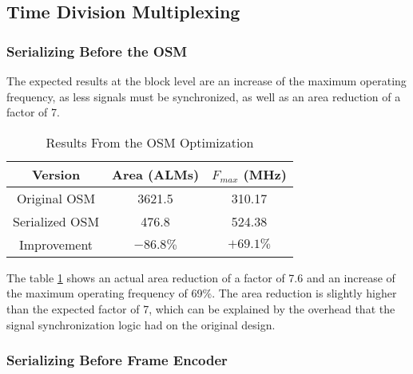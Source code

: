 
\subsection{Time Division Multiplexing}


\subsubsection{Serializing Before the OSM}

The expected results at the block level are an increase of the maximum operating frequency, as less signals must be synchronized, as well as an area reduction of a factor of 7.

\begin{table}[ht]
    \centering
    \begin{tabular}{|c|c|c|}
        \hline
        Version & Area (ALMs) & \(F_{max}\) (MHz) \\
        \hline
        Original OSM & 3621.5 & 310.17 \\
        Serialized OSM & 476.8 & 524.38  \\
        \hline
        Improvement & \(-86.8\%\) & \(+69.1\%\) \\
        \hline
    \end{tabular}
    \caption{Results From the OSM Optimization}
    \label{tab:osm-optimization}
\end{table}

The table \ref{tab:osm-optimization} shows an actual area reduction of a factor of 7.6 and an increase of the maximum operating frequency of 69\%. The area reduction is slightly higher than the expected factor of 7, which can be explained by the overhead that the signal synchronization logic had on the original design. 


\subsubsection{Serializing Before Frame Encoder}


